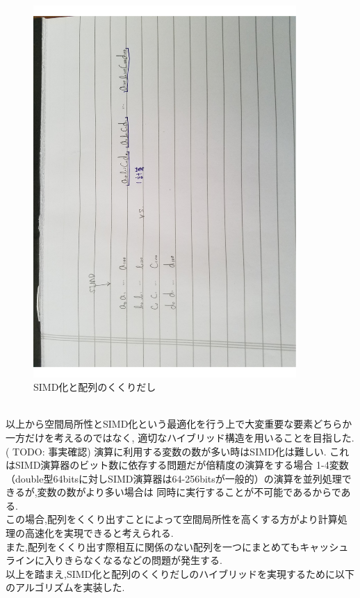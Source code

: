 \begin{figure}[htb]
  \begin{center}
    \includegraphics[width=10.0cm, angle=-90]{./images/simd_soa.pdf}
    \caption{SIMD化と配列のくくりだし}
    \label{fig:simd-soa}
  \end{center}
\end{figure}~\\
以上から空間局所性とSIMD化という最適化を行う上で大変重要な要素どちらか一方だけを考えるのではなく,
適切なハイブリッド構造を用いることを目指した.\\
( TODO: 事実確認)
演算に利用する変数の数が多い時はSIMD化は難しい. これはSIMD演算器のビット数に依存する問題だが倍精度の演算をする場合
1-4変数（double型64bitsに対しSIMD演算器は64-256bitsが一般的）の演算を並列処理できるが,変数の数がより多い場合は
同時に実行することが不可能であるからである.\\
この場合,配列をくくり出すことによって空間局所性を高くする方がより計算処理の高速化を実現できると考えられる.\\
また,配列をくくり出す際相互に関係のない配列を一つにまとめてもキャッシュラインに入りきらなくなるなどの問題が発生する.\\

以上を踏まえ,SIMD化と配列のくくりだしのハイブリッドを実現するために以下のアルゴリズムを実装した.\\
{\footnotesize

}~\\

